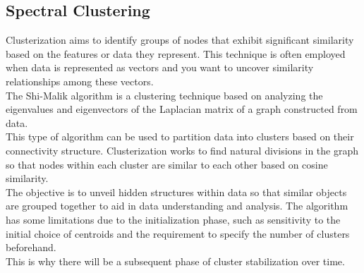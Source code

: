 %

\subsection{Spectral Clustering}
Clusterization aims to identify groups of nodes that exhibit significant similarity based on the features or data they represent.
This technique is often employed when data is represented as vectors and you want to uncover similarity relationships among these vectors.\\
The Shi-Malik algorithm is a clustering technique based on analyzing the eigenvalues and eigenvectors of the Laplacian matrix of a graph constructed from data.\\
This type of algorithm can be used to partition data into clusters based on their connectivity structure.
Clusterization works to find natural divisions in the graph so that nodes within each cluster are similar to each other based on cosine similarity. \\
The objective is to unveil hidden structures within data so that similar objects are grouped together to aid in data understanding and analysis.
The algorithm has some limitations due to the initialization phase, such as sensitivity to the initial choice of centroids and the requirement to specify the number of clusters beforehand.\\
This is why there will be a subsequent phase of cluster stabilization over time.

